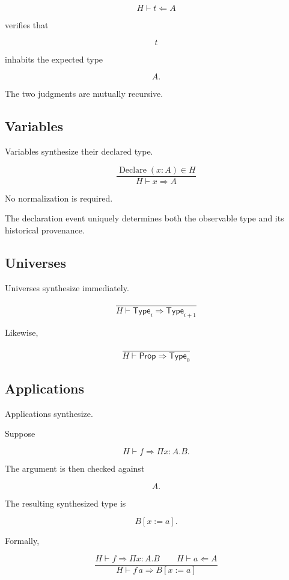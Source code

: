 \documentclass[12pt,oneside]{article}
\theoremstyle{definition}
\theoremstyle{remark}
\newcommand{\Type}{\mathsf{Type}}
\newcommand{\Prop}{\mathsf{Prop}}
\begin{document}
\[
H
\vdash
t
\Leftarrow
A
\]

verifies that

\[
t
\]

inhabits the expected type

\[
A.
\]

The two judgments are mutually recursive.


\subsection{Variables}

Variables synthesize their declared type.

\[
\frac{
\operatorname{Declare}(x:A)
\in
H
}{
H
\vdash
x
\Rightarrow
A
}
\]

No normalization is required.

The declaration event uniquely determines both the observable type and its
historical provenance.


\subsection{Universes}

Universes synthesize immediately.

\[
\frac{}{
H
\vdash
\Type_i
\Rightarrow
\Type_{i+1}
}
\]

Likewise,

\[
\frac{}{
H
\vdash
\Prop
\Rightarrow
\Type_0
}
\]


\subsection{Applications}

Applications synthesize.

Suppose

\[
H
\vdash
f
\Rightarrow
\Pi x:A.B.
\]

The argument is then checked against

\[
A.
\]

The resulting synthesized type is

\[
B[x:=a].
\]

Formally,

\[
\frac{
H
\vdash
f
\Rightarrow
\Pi x:A.B
\qquad
H
\vdash
a
\Leftarrow
A
}{
H
\vdash
f\,a
\Rightarrow
B[x:=a]
}
\]
\end{document}
